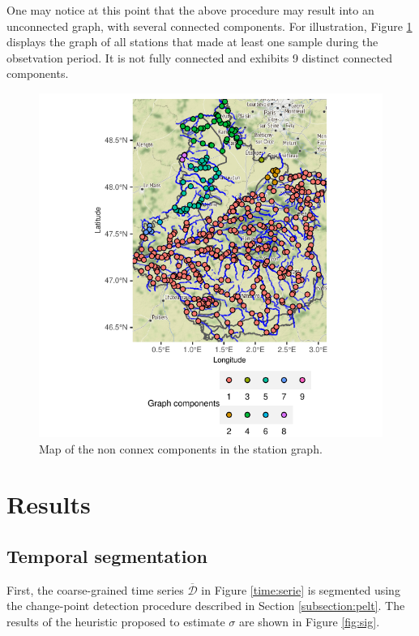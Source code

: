 One may notice at this point that the above procedure may result into an unconnected graph, with several connected components. For illustration, Figure \ref{fig:comp} displays the graph of all stations that made at least one sample during the obsetvation period. It is not fully connected and exhibits 9 distinct connected components.  

\begin{figure}[ht]
  \centering
  \includegraphics[]{figs/Chap5/Graph_comp-1.pdf}
  \caption{Map of the non connex components in the station graph.}
  \label{fig:comp}
\end{figure}


\section{Results}\label{section:results}

\subsection{Temporal segmentation}\label{sec:time_pattern}

First, the coarse-grained time series $\overline{\mathcal{D}}$ in Figure \ref{time:serie} is segmented using the change-point detection procedure described in Section \ref{subsection:pelt}. The results of the heuristic proposed to estimate $\sigma$ are shown in Figure \ref{fig:sig}.

